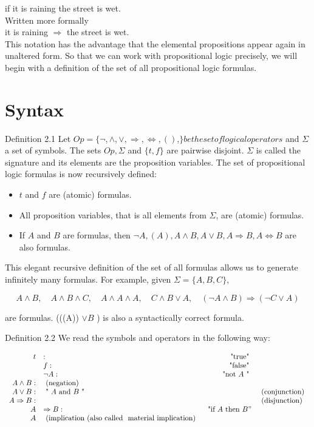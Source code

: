 \documentclass[10pt]{book}
\begin{document}
if it is raining the street is wet.\\
Written more formally\\
it is raining $\Rightarrow$ the street is wet.\\
This notation has the advantage that the elemental propositions appear again in unaltered form. So that we can work with propositional logic precisely, we will begin with a definition of the set of all propositional logic formulas.

\section{Syntax}
Definition 2.1 Let $O p=\{\neg, \wedge, \vee, \Rightarrow, \Leftrightarrow,()$,$\} be the set of logical operators$ and $\Sigma$ a set of symbols. The sets $O p, \Sigma$ and $\{t, f\}$ are pairwise disjoint. $\Sigma$ is called the signature and its elements are the proposition variables. The set of propositional logic formulas is now recursively defined:

\begin{itemize}
  \item $t$ and $f$ are (atomic) formulas.
  \item All proposition variables, that is all elements from $\Sigma$, are (atomic) formulas.
  \item If $A$ and $B$ are formulas, then $\neg A,(A), A \wedge B, A \vee B, A \Rightarrow B, A \Leftrightarrow B$ are also formulas.
\end{itemize}

This elegant recursive definition of the set of all formulas allows us to generate infinitely many formulas. For example, given $\Sigma=\{A, B, C\}$,

$$
A \wedge B, \quad A \wedge B \wedge C, \quad A \wedge A \wedge A, \quad C \wedge B \vee A, \quad(\neg A \wedge B) \Rightarrow(\neg C \vee A)
$$

are formulas. (((A)) $\vee B$ ) is also a syntactically correct formula.

Definition 2.2 We read the symbols and operators in the following way:

$$
\begin{array}{rlrl}
t & : & \text { "true" } & \\
& f: & \text { "false" } & \\
& \neg A: & \text { "not } A \text { " } & \\
A \wedge B: & \text { (negation) } \\\index{Clause}\index{Conjunctive Normal Form (CNF)}\index{Literal}\index{Normal equations!conjunctive}
A \vee B: & \text { " } A \text { and } B \text { " } & & \text { (conjunction) } \\\index{Conjunction}
A \Rightarrow B: & & & \text { (disjunction) } \\\index{Disjunction}
A & \Rightarrow B: & \text { "if } A \text { then } B " & \\
A & \text { (implication (also called } \text { material implication) }
\end{array}
$$
\end{document}
